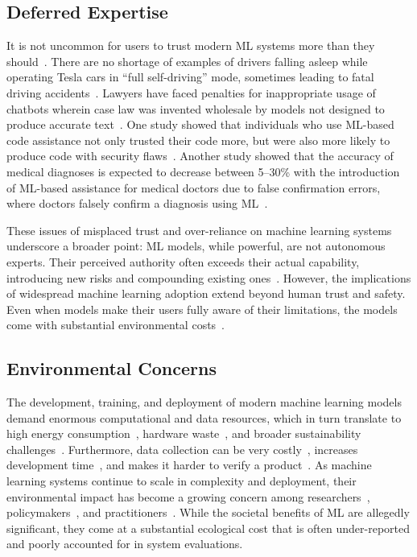 \subsection{Deferred Expertise}
\label{subsec:false_expertise}
It is not uncommon for users to trust modern ML systems more than they should~\cite{teslasleep1,teslasleep2,teslasleep3,chatgptlawyer,rosenbacke2024ai}. 
There are no shortage of examples of drivers falling asleep while operating Tesla cars in ``full self-driving'' mode, sometimes leading to fatal driving accidents~\cite{teslasleep1,teslasleep2,teslasleep3}. 
Lawyers have faced penalties for inappropriate usage of chatbots wherein case law was invented wholesale by models not designed to produce accurate text~\cite{chatgptlawyer}.
One study showed that individuals who use ML-based code assistance not only trusted their code more, but were also more likely to produce code with security flaws~\cite{perry2023users}. 
Another study showed that the accuracy of medical diagnoses is expected to decrease between 5--30\% with the introduction of ML-based assistance for medical doctors due to false confirmation errors, where doctors falsely confirm a diagnosis using ML~\cite{rosenbacke2024ai}. 

These issues of misplaced trust and over-reliance on machine learning systems underscore a broader point: ML models, while powerful, are not autonomous experts. 
Their perceived authority often exceeds their actual capability, introducing new risks and compounding existing ones~\cite{chatgptlawyer,perry2023users,rosenbacke2024ai}. 
However, the implications of widespread machine learning adoption extend beyond human trust and safety. 
Even when models make their users fully aware of their limitations, the models come with substantial environmental costs~\cite{ai_environment,ai_power,indian_point}. 

\subsection{Environmental Concerns}
\label{subsec:environment}

The development, training, and deployment of modern machine learning models demand enormous computational and data resources, which in turn translate to high energy consumption~\cite{ai_power}, hardware waste~\cite{ai_environment}, and broader sustainability challenges~\cite{ai_water,indian_point}.
Furthermore, data collection can be very costly~\cite{roh2019survey}, increases development time~\cite{lam2004new}, and makes it harder to verify a product~\cite{zirger1996effect}. 
As machine learning systems continue to scale in complexity and deployment, their environmental impact has become a growing concern among researchers~\cite{ai_power}, policymakers~\cite{indian_point}, and practitioners~\cite{li2023clover}. 
While the societal benefits of ML are allegedly significant, they come at a substantial ecological cost that is often under-reported and poorly accounted for in system evaluations.

